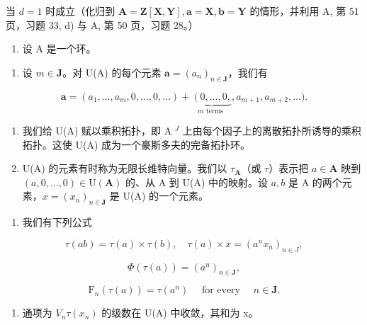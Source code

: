 当 \(d=1\) 时成立（化归到 \(\mathbf{A}=\mathbf{Z}[\mathbf{X},\mathbf{Y}],\mathbf{a}=\mathbf{X},\mathbf{b}=\mathbf{Y}\) 的情形，并利用 A, 第 51 页，习题 33, d) 与 A, 第 50 页，习题 28。）

\begin{enumerate}
\def\labelenumi{\arabic{enumi})}
\setcounter{enumi}{36}
\tightlist
\item
  设 A 是一个环。
\end{enumerate}

\begin{enumerate}
\def\labelenumi{\alph{enumi})}
\tightlist
\item
  设 \(m \in \mathbf{J}\)。对 U(A) 的每个元素 \(\boldsymbol{a} = (a_n)_{n \in \mathbf{J}}\)，我们有
\end{enumerate}

\[
\boldsymbol {a} = \left(a _ {1}, \dots , a _ {m}, 0, \dots , 0, \dots\right) + \underbrace {\left(0 , \dots , 0 , \right.} _ {m \text {   terms }}, a _ {m + 1}, a _ {m + 2}, \dots).
\]

\begin{enumerate}
\def\labelenumi{\alph{enumi})}
\setcounter{enumi}{1}
\item
  我们给 U(A) 赋以乘积拓扑，即 A \(^{J}\) 上由每个因子上的离散拓扑所诱导的乘积拓扑。这使 U(A) 成为一个豪斯多夫的完备拓扑环。
\item
  U(A) 的元素有时称为无限长维特向量。我们以 \(\tau_{\mathbf{A}}\)（或 \(\tau\)）表示把 \(a \in \mathbf{A}\) 映到 \((a, 0, ..., 0) \in \mathrm{U}(\mathbf{A})\) 的、从 A 到 U(A) 中的映射。设 \(a, b\) 是 A 的两个元素，\(x = (x_n)_{n \in \mathbf{J}}\) 是 U(A) 的一个元素。
\end{enumerate}

\begin{enumerate}
\def\labelenumi{(\roman{enumi})}
\tightlist
\item
  我们有下列公式
\end{enumerate}

\[
\tau (a b) = \tau (a) \times \tau (b), \quad \tau (a) \times x = \left(a ^ {n} x _ {n}\right) _ {n \in J},
\]

\[
\Phi (\tau (a)) = (a ^ {n}) _ {n \in \mathbf {J}},
\]

\[
\mathrm{F} _ {n} (\tau (a)) = \tau (a ^ {n}) \quad \text { for every } \quad n \in \mathbf {J}.
\]

\begin{enumerate}
\def\labelenumi{(\roman{enumi})}
\setcounter{enumi}{1}
\tightlist
\item
  通项为 \(V_{n}\tau(x_{n})\) 的级数在 U(A) 中收敛，其和为 x。
\end{enumerate}

